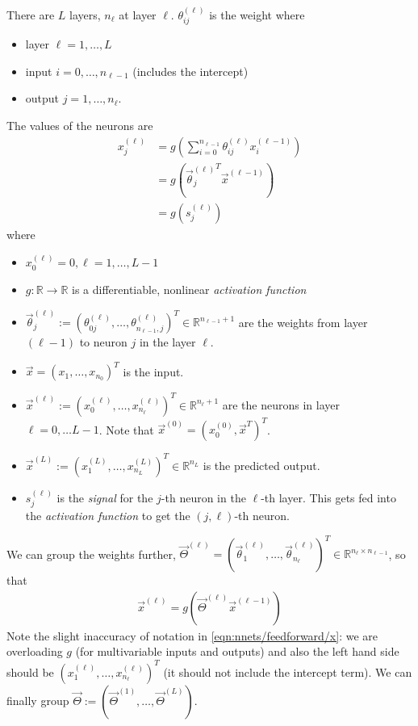 There are $L$ layers, $n_{\ell}$ at layer $\ell$. $\theta_{ij}^{(\ell)}$ is the weight where
\begin{itemize}
    \item layer $\ell = 1, \dotsc, L$
    \item input $i = 0, \dotsc, n_{\ell - 1}$ (includes the intercept)
    \item output $j = 1, \dotsc, n_\ell$.
\end{itemize}
The values of the neurons are
\begin{align}
    x_j^{(\ell)}    &= g\left(\sum_{i = 0}^{n_{\ell - 1}} \theta_{ij}^{(\ell)} x_i^{(\ell - 1)}\right) \label{eqn:nnets/feedforward/x-small}\\
                    &= g\left({\vec \theta_j^{(\ell)}}^T \vec x^{(\ell - 1)}\right) \\
                    &= g\left(s_j^{(\ell)}\right)
\end{align}
where
\begin{itemize}
    \item $x_0^{(\ell)} = 0, \ell = 1, \dotsc, L - 1$
    \item $g: \mathbb R \to \mathbb R$ is a differentiable, nonlinear \emph{activation function}
    \item $\vec \theta_j^{(\ell)} := (\theta_{0j}^{(\ell)}, \dotsc, \theta_{n_{\ell - 1}, j}^{(\ell)})^T \in \mathbb R^{n_{\ell - 1} + 1}$ are the weights from layer $(\ell - 1)$ to neuron $j$ in the layer $\ell$.
    \item $\vec x = (x_1, \dotsc, x_{n_0})^T$ is the input.
    \item $\vec x^{(\ell)} := (x_0^{(\ell)}, \dotsc, x_{n_\ell}^{(\ell)})^T \in \mathbb R^{n_\ell + 1}$ are the neurons in layer $\ell = 0, \dotsc L - 1$. Note that $\vec x^{(0)} = \left(x_0^{(0)}, \vec x^T\right)^T$.
    \item $\vec x^{(L)} := (x_1^{(L)}, \dotsc, x_{n_L}^{(L)})^T \in \mathbb R^{n_L}$ is the predicted output.
    \item $s_j^{(\ell)}$ is the \emph{signal} for the $j$-th neuron in the $\ell$-th layer. This gets fed into the \emph{activation function} to get the $(j, \ell)$-th neuron.
\end{itemize}
We can group the weights further, $\vec \Theta^{(\ell)} = (\vec \theta_1^{(\ell)}, \dotsc, \vec \theta_{n_\ell}^{(\ell)})^T \in \mathbb R^{n_\ell \times n_{\ell - 1}}$, so that
\begin{align}
    \vec x^{(\ell)} = g\left(\vec \Theta^{(\ell)} \vec x^{(\ell - 1)}\right) \label{eqn:nnets/feedforward/x}
\end{align}
Note the slight inaccuracy of notation in \eqref{eqn:nnets/feedforward/x}: we are overloading $g$ (for multivariable inputs and outputs) and also the left hand side should be $(x_1^{(\ell)}, \dotsc, x_{n_\ell}^{(\ell)})^T$ (it should not include the intercept term). We can finally group $\vec \Theta := (\vec \Theta^{(1)}, \dotsc, \vec \Theta^{(L)})$.

